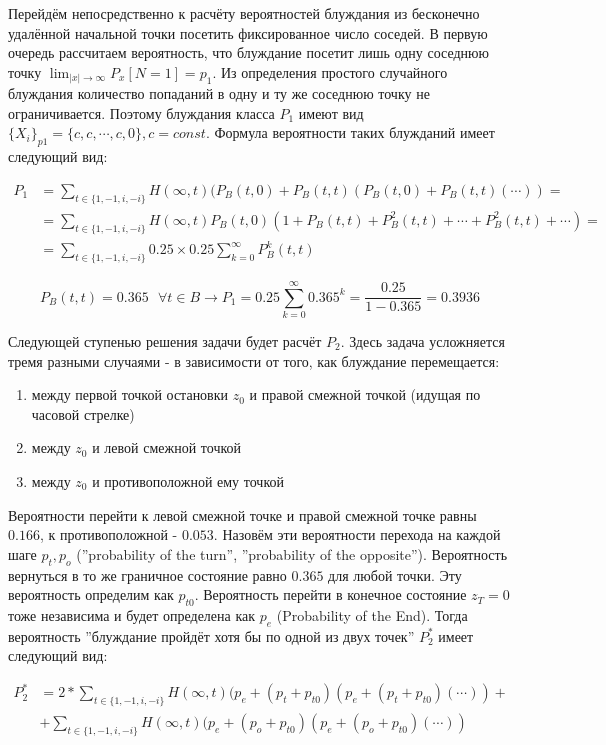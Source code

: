 Перейдём непосредственно к расчёту вероятностей блуждания из бесконечно удалённой начальной точки посетить фиксированное число соседей.
В первую очередь рассчитаем вероятность, что блуждание посетит лишь одну соседнюю точку $\lim_{|x| \to \infty} P_x[N=1] = p_1$. 
Из определения простого случайного блуждания количество попаданий в одну и ту же соседнюю точку не ограничивается.
Поэтому блуждания класса $P_1$ имеют вид $\{X_i\}_{p1} = \{c, c, \cdots, c, 0\}, c=const$.
Формула вероятности таких блужданий имеет следующий вид:

\begin{align*}
P_1 &= \sum_{t \in \{1, -1, i, -i\}} H(\infty, t) (P_B(t, 0) + P_B(t,t) (P_B(t,0) + P_B(t,t) (\cdots)) = \\
    &= \sum_{t \in \{1, -1, i, -i\}} H(\infty, t) P_B(t,0) (1 + P_B(t,t) + P_B^2(t,t) + \cdots + P_B^2(t,t) + \cdots) = \\
    &= \sum_{t \in \{1, -1, i, -i\}} 0.25 \times 0.25 \sum_{k=0}^{\infty} P_B^k(t,t)
\end{align*}

\[ P_B(t,t) = 0.365\ \ \  \forall t \in B \rightarrow P_1 = 0.25 \sum_{k=0}^{\infty} 0.365^k = \frac{0.25}{1 - 0.365} = 0.3936 \]

Следующей ступенью решения задачи будет расчёт $P_2$.
Здесь задача усложняется тремя разными случаями - в зависимости от того, как блуждание перемещается:

\begin{enumerate}
\item между первой точкой остановки $z_0$ и правой смежной точкой (идущая по часовой стрелке)
\item между $z_0$ и левой смежной точкой
\item между $z_0$ и противоположной ему точкой
\end{enumerate}

Вероятности перейти к левой смежной точке и правой смежной точке равны $0.166$, к противоположной - $0.053$.
Назовём эти вероятности перехода на каждой шаге $p_t, p_o$ (''probability of the turn'', ''probability of the opposite'').
Вероятность вернуться в то же граничное состояние равно $0.365$ для любой точки.
Эту вероятность определим как $p_{t0}$.
Вероятность перейти в конечное состояние $z_T = 0$ тоже независима и будет определена как $p_e$ (Probability of the End).
Тогда вероятность ''блуждание пройдёт хотя бы по одной из двух точек'' $P_2^*$ имеет следующий вид:

\begin{align*}
P_2^* &= 2 * \sum_{t \in \{1, -1, i, -i\}} H(\infty, t) (p_e + (p_t + p_{t0}) (p_e + (p_t + p_{t0}) (\cdots)) + \\
      &+ \sum_{t \in \{1, -1, i, -i\}} H(\infty, t) (p_e + (p_o + p_{t0}) (p_e + (p_o + p_{t0}) (\cdots))
\end{align*}

